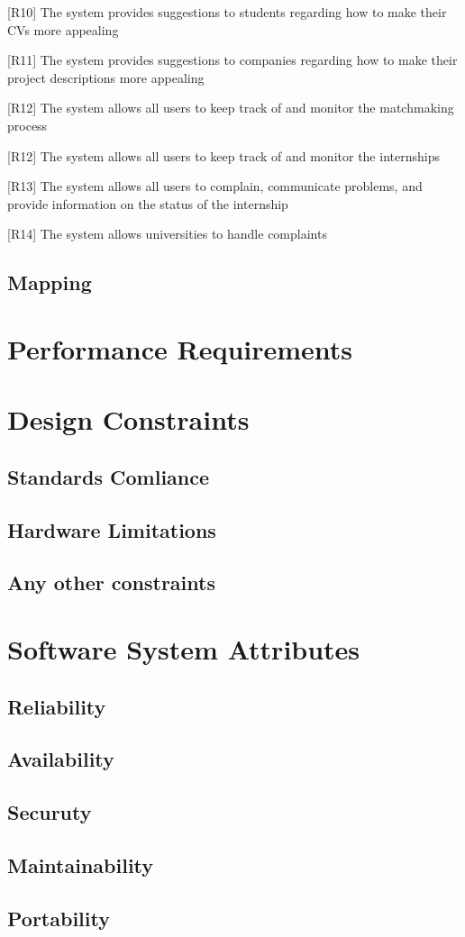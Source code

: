[R10] The system provides suggestions to students regarding how to make their CVs more appealing

[R11] The system provides suggestions to companies regarding how to make their project descriptions more appealing

[R12] The system allows all users to keep track of and monitor the matchmaking process

[R12] The system allows all users to keep track of and monitor the internships

[R13] The system allows all users to complain, communicate problems, and provide information on the status of the internship

[R14] The system allows universities to handle complaints



\subsection{Mapping}




\section{Performance Requirements}

\section{Design Constraints}
\subsection{Standards Comliance}
\subsection{Hardware Limitations}
\subsection{Any other constraints}

\section{Software System Attributes}
\subsection{Reliability}
\subsection{Availability}
\subsection{Securuty}
\subsection{Maintainability}
\subsection{Portability}